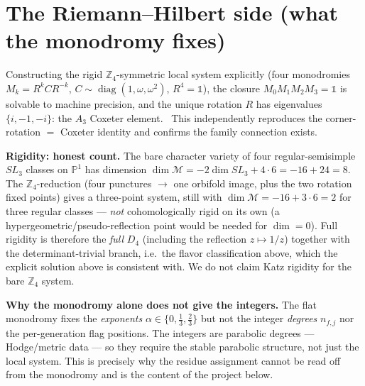 \documentclass[11pt,a4paper]{article}
\theoremstyle{definition}
\begin{document}
\section{The Riemann--Hilbert side (what the monodromy fixes)}
Constructing the rigid $\mathbb Z_4$-symmetric local system explicitly (four monodromies
$M_k=R^kCR^{-k}$, $C\sim\operatorname{diag}(1,\omega,\omega^2)$, $R^4=\mathbb 1$), the closure
$M_0M_1M_2M_3=\mathbb 1$ is solvable to machine precision, and the unique rotation $R$ has eigenvalues
$\{i,-1,-i\}$: the $A_3$ Coxeter element. \mE\ This independently reproduces the corner-rotation
$=$ Coxeter identity and confirms the family connection exists.

\par\smallskip\noindent\textbf{Rigidity: honest count.}
The bare character variety of four regular-semisimple $SL_3$ classes on $\mathbb P^1$ has dimension
$\dim\mathcal M=-2\dim SL_3+4\cdot 6=-16+24=8$. The $\mathbb Z_4$-reduction (four punctures $\to$ one
orbifold image, plus the two rotation fixed points) gives a three-point system, still with
$\dim\mathcal M=-16+3\cdot 6=2$ for three regular classes --- \emph{not} cohomologically rigid on its
own (a hypergeometric/pseudo-reflection point would be needed for $\dim=0$). Full rigidity is therefore
the \emph{full} $D_4$ (including the reflection $z\mapsto 1/z$) together with the determinant-trivial
branch, i.e.\ the flavor classification above, which the explicit solution above is consistent with. We do not
claim Katz rigidity for the bare $\mathbb Z_4$ system.
\par\smallskip

\par\smallskip\noindent\textbf{Why the monodromy alone does not give the integers.}
The flat monodromy fixes the \emph{exponents} $\alpha\in\{0,\tfrac13,\tfrac23\}$ but not the integer
\emph{degrees} $n_{f,j}$ nor the per-generation flag positions. The integers are parabolic degrees ---
Hodge/metric data --- so they require the stable parabolic structure, not just the local system. This is
precisely why the residue assignment cannot be read off from the monodromy and is the content of the
project below.
\par\smallskip

\end{document}
